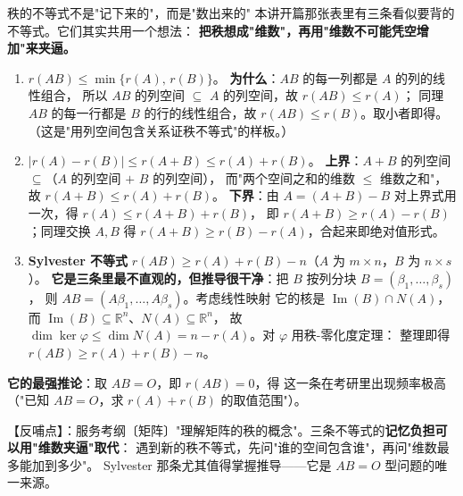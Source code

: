 \begin{fdeep}{秩的不等式不是"记下来的"，而是"数出来的"}
本讲开篇那张表里有三条看似要背的不等式。它们其实共用一个想法：
\textbf{把秩想成"维数"，再用"维数不可能凭空增加"来夹逼。}
\begin{enumerate}[leftmargin=2.2em,itemsep=0.25em]
\item $r(AB)\le\min\{r(A),\,r(B)\}$。
      \textbf{为什么}：$AB$ 的每一列都是 $A$ 的列的线性组合，
      所以 $AB$ 的列空间 $\subseteq$ $A$ 的列空间，故 $r(AB)\le r(A)$；
      同理 $AB$ 的每一行都是 $B$ 的行的线性组合，故 $r(AB)\le r(B)$。取小者即得。
      （这是"用列空间包含关系证秩不等式"的样板。）
\item $\lvert r(A)-r(B)\rvert\le r(A+B)\le r(A)+r(B)$。
      \textbf{上界}：$A+B$ 的列空间 $\subseteq$（$A$ 的列空间 $+$ $B$ 的列空间），
      而"两个空间之和的维数 $\le$ 维数之和"，故 $r(A+B)\le r(A)+r(B)$。
      \textbf{下界}：由 $A=(A+B)-B$ 对上界式用一次，得 $r(A)\le r(A+B)+r(B)$，
      即 $r(A+B)\ge r(A)-r(B)$；同理交换 $A,B$ 得 $r(A+B)\ge r(B)-r(A)$，合起来即绝对值形式。
\item \textbf{Sylvester 不等式} $r(AB)\ge r(A)+r(B)-n$（$A$ 为 $m\times n$，$B$ 为 $n\times s$）。
      \textbf{它是三条里最不直观的，但推导很干净}：把 $B$ 按列分块 $B=(\beta_1,\dots,\beta_s)$，
      则 $AB=(A\beta_1,\dots,A\beta_s)$。考虑线性映射
      它的核是 $\operatorname{Im}(B)\cap N(A)$，而 $\operatorname{Im}(B)\subseteq\mathbb{R}^{n}$、$N(A)\subseteq\mathbb{R}^{n}$，
      故 $\dim\ker\varphi\le\dim N(A)=n-r(A)$。对 $\varphi$ 用秩-零化度定理：
      整理即得 $r(AB)\ge r(A)+r(B)-n$。
\end{enumerate}
\textbf{它的最强推论}：取 $AB=O$，即 $r(AB)=0$，得
这一条在考研里出现频率极高（"已知 $AB=O$，求 $r(A)+r(B)$ 的取值范围"）。

【反哺点】：服务考纲〔矩阵〕"理解矩阵的秩的概念"。三条不等式的\textbf{记忆负担可以用"维数夹逼"取代}：
遇到新的秩不等式，先问"谁的空间包含谁"，再问"维数最多能加到多少"。
Sylvester 那条尤其值得掌握推导——它是 $AB=O$ 型问题的唯一来源。
\end{fdeep}

